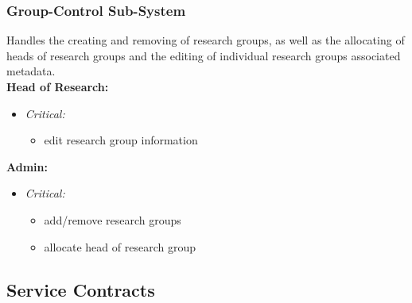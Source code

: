 \documentclass{article}
\begin{document}
			\subsubsection{Group-Control Sub-System}\label{subsubsec:priority-group}
				Handles the creating and removing of research groups, as well as the allocating of heads of research groups and the editing of individual research groups associated metadata.\\
				[3mm]
				\textbf{Head of Research:}
				\begin{itemize}					
					\item \textit{Critical:}
					\begin{itemize}
						\item edit research group information
					\end{itemize}
				\end{itemize}
				\textbf{Admin:}
				\begin{itemize}
					\item \textit{Critical:}
					\begin{itemize}
						\item add/remove research groups
						\item allocate head of research group
					\end{itemize}
				\end{itemize}
			
		\cleardoublepage
		\subsection{Service Contracts}\label{subsec:servicecontracts}
\end{document}
